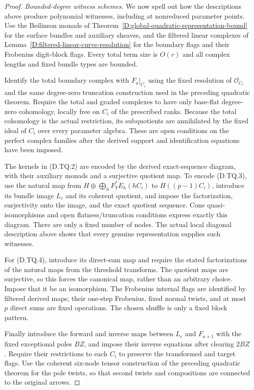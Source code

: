 \begin{proof}
\emph{Bounded-degree witness schemes.}
We now spell out how the descriptions above
produce polynomial witnesses, including at
nonreduced parameter points.
Use the Beilinson monads of
Theorem~\ref{D:global-quadratic-representation-bound}
for the surface bundles and auxiliary sheaves,
and the filtered linear complexes of
Lemma~\ref{D:filtered-linear-curve-resolution}
for the boundary flags and their Frobenius
digit-block flags.  Every total term size is
$O(r)$ and all complex lengths and fixed bundle
types are bounded.

Identify the total boundary complex with
$F_a|_{C_i}$ using the fixed resolution of
$\mathcal O_{C_i}$ and the same degree-zero
truncation construction used in the preceding
quadratic theorem.  Require the total and
graded complexes to have only base-flat
degree-zero cohomology, locally free on $C_i$
of the prescribed ranks.  Because the total
cohomology is the actual restriction, its
subquotients are annihilated by the fixed ideal
of $C_i$ over every parameter algebra.
These are open conditions on the perfect
complex families after the derived support
and identification equations have been imposed.

The kernels in (D.TQ.2) are encoded by the
derived exact-sequence diagram, with their
auxiliary monads and a surjective quotient map.
To encode (D.TQ.3), use the natural map from
$H\oplus\bigoplus_hF_Y^*E_h(hC_i)$ to
$H((p-1)C_i)$, introduce its bundle image $L_c$
and its coherent quotient, and impose the
factorization, surjectivity onto the image,
and the exact quotient sequence.  Cone
quasi-isomorphisms and open flatness/truncation
conditions express exactly this diagram.
There are only a fixed number of nodes.
The actual local diagonal description above
shows that every genuine representation supplies
such witnesses.

For (D.TQ.4), introduce its direct-sum map and
require the stated factorizations of the
natural maps from the threshold transforms.
The quotient maps are surjective, so this
forces the canonical map, rather than an
arbitrary choice.  Impose that it be an
isomorphism.  The Frobenius internal flags
are identified by filtered derived maps;
their one-step Frobenius, fixed normal twists,
and at most $p$ direct sums are fixed
operations.  The chosen shuffle is only a
fixed block pattern.

Finally introduce the forward and inverse
maps between $L_c$ and $F_{a+1}$ with the
fixed exceptional poles $BZ$, and impose
their inverse equations after clearing
$2BZ$.  Require their restrictions to each
$C_i$ to preserve the transformed and target
flags.  Use the coherent six-node tensor
construction of the preceding quadratic
theorem for the pole twists, so that second
twists and compositions are connected to
the original arrows.


\end{proof}
